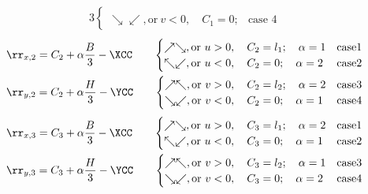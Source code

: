 \documentclass[fleqn]{article}
\begin{document}
{\begin{alignat}{3}
\begin{cases}
 \\
        \searrow \swarrow, \text{or}~v <0,   \quad   C_1 = 0;      &   \text{case 4}
    \end{cases}
\end{alignat}
%
%
\begin{alignat}{3}
    &\rr_{x,2} = C_2 + \alpha\frac{B}{3} - \XCC     \quad&
    \begin{cases}
        \nearrow \searrow, \text{or}~u >0,\quad C_2 = l_1;  \quad   \alpha = 1  &   \text{case1}
 \\
        \nwarrow \swarrow, \text{or}~u <0,\quad C_2 = 0;    \quad   \alpha = 2  &   \text{case2}
    \end{cases}
%
\\
%
    &\rr_{y,2} = C_2 + \alpha\frac{H}{3} - \YCC     \quad&
    \begin{cases}
        \nearrow \nwarrow,\text{or}~v >0, \quad C_2 = l_2; \quad   \alpha = 2   &   \text{case3}
 \\
        \searrow \swarrow,\text{or}~v <0, \quad C_2 = 0;   \quad   \alpha = 1   &   \text{case4}
    \end{cases}
\end{alignat}
%
%
\begin{alignat}{3}
    &\rr_{x,3} = C_3 + \alpha\frac{B}{3} - \XCC     \quad&
    \begin{cases}
        \nearrow \searrow, \text{or}~u >0,\quad C_3 = l_1;  \quad   \alpha = 2  &   \text{case1}
 \\
        \nwarrow \swarrow, \text{or}~u <0,\quad C_3 = 0;    \quad   \alpha = 1  &   \text{case2}
    \end{cases}
%
\\
%
    &\rr_{y,3} = C_3 + \alpha\frac{H}{3} - \YCC     \quad&
    \begin{cases}
        \nearrow \nwarrow,\text{or}~v >0, \quad C_3 = l_2; \quad   \alpha = 1   &   \text{case3}
 \\
        \searrow \swarrow,\text{or}~v <0, \quad C_3 = 0;   \quad   \alpha = 2   & \text{case4}
    \end{cases}
\end{alignat}
%
%
\\
}
\end{document}
